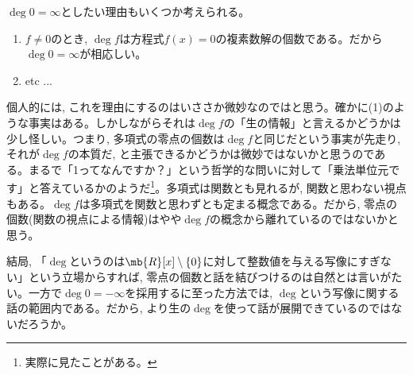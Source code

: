 $\deg{0} = \infty$としたい理由もいくつか考えられる。
\begin{enumerate}
 \item $f\neq 0$のとき, $\deg{f}$は方程式$f(x) = 0$の複素数解の個数である。だから$\deg{0} = \infty$が相応しい。
 \item etc ... 
\end{enumerate}
個人的には, これを理由にするのはいささか微妙なのではと思う。確かに(1)のような事実はある。しかしながらそれは$\deg{f}$の「生の情報」と言えるかどうかは少し怪しい。つまり, 多項式の零点の個数は$\deg{f}$と同じだという事実が先走り, それが$\deg{f}$の本質だ, と主張できるかどうかは微妙ではないかと思うのである。まるで「1ってなんですか？」という哲学的な問いに対して「乗法単位元です」と答えているかのようだ\footnote{実際に見たことがある。}。多項式は関数とも見れるが, 関数と思わない視点もある。$\deg{f}$は多項式を関数と思わずとも定まる概念である。だから, 零点の個数(関数の視点による情報)はやや$\deg{f}$の概念から離れているのではないかと思う。\par
結局, 「$\deg{}$というのは$\mb{R}[x]\setminus{\{ 0 \}}$に対して整数値を与える写像にすぎない」という立場からすれば, 零点の個数と話を結びつけるのは自然とは言いがたい。一方で$\deg{0} = -\infty$を採用するに至った方法では, $\deg{}$という写像に関する話の範囲内である。だから, より生の$\deg{}$を使って話が展開できているのではないだろうか。
